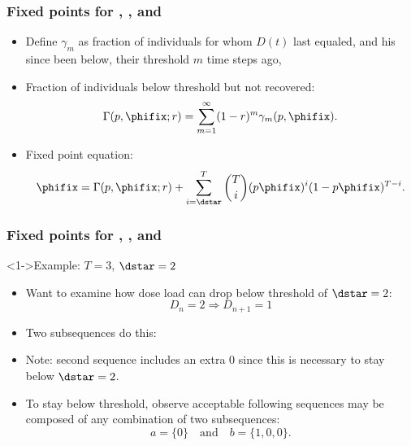 \begin{frame}
  \frametitle{Fixed points for , , and }

  \begin{itemize}
  \item<1->
    Define $\gamma_m$ as fraction of individuals 
    for whom $D(t)$ last equaled, and his since been
    below, their threshold $m$ time steps ago,
  \item<2->
    Fraction of individuals below threshold but not recovered:
    $$
    \Gamma(p,\phifix;r) = \sum_{m=1}^{\infty} (1-r)^m \gamma_m(p,\phifix).
    $$
  \item<3->
    Fixed point equation:
    $$
    \phifix = \Gamma(p,\phifix;r) 
    + \sum_{i=\dstar}^{T}
    \binom{T}{i}
    (p\phifix)^{i} (1 - p\phifix)^{T-i}.
    $$
  \end{itemize}

\end{frame}


\begin{frame}
  \frametitle{Fixed points for , , and }

  \begin{block}<1->{Example: $T=3$, $\dstar=2$}
    \begin{itemize}
    \item<2-> 
      Want to examine how dose load can drop below threshold of $\dstar=2$:
      $$D_n=2 \Rightarrow D_{n+1}=1$$
    \item<3-> 
      Two subsequences do this:
    \item<6->
      Note: second sequence includes an extra 0 since
      this is necessary to stay below $\dstar=2$.
    \item<7->
      To stay below threshold, observe
      acceptable following sequences may be composed of
      any combination of two subsequences:
      $$ 
      a=\{0\} \quad \mbox{and} \quad b=\{1,0,0\}. 
      $$
    \end{itemize}
  \end{block}

\end{frame}


